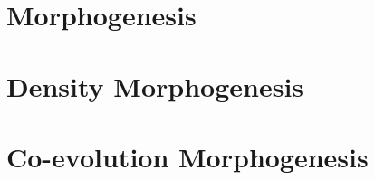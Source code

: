 \documentclass[english,11pt]{beamer}
\newcommand{\sframe}[2]{\frame{\frametitle{#1} #2}}
\begin{document}
\section*{Morphogenesis}


%
%
%
%
%
%
%




\section*{Density Morphogenesis}



%



\section*{Co-evolution Morphogenesis}
\end{document}
